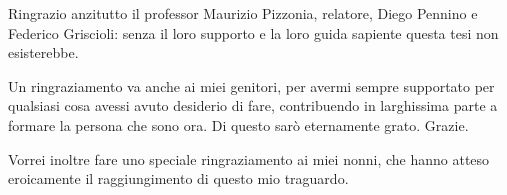 Ringrazio anzitutto il professor Maurizio Pizzonia, relatore, Diego Pennino e Federico Griscioli: senza il loro supporto e la loro guida sapiente questa tesi non esisterebbe.

Un ringraziamento va anche ai miei genitori, per avermi sempre supportato per qualsiasi cosa avessi avuto desiderio di fare, contribuendo in larghissima parte a formare la persona che sono ora. Di questo sarò eternamente grato. Grazie.

Vorrei inoltre fare uno speciale ringraziamento ai miei nonni, che hanno atteso eroicamente il raggiungimento di questo mio traguardo.

